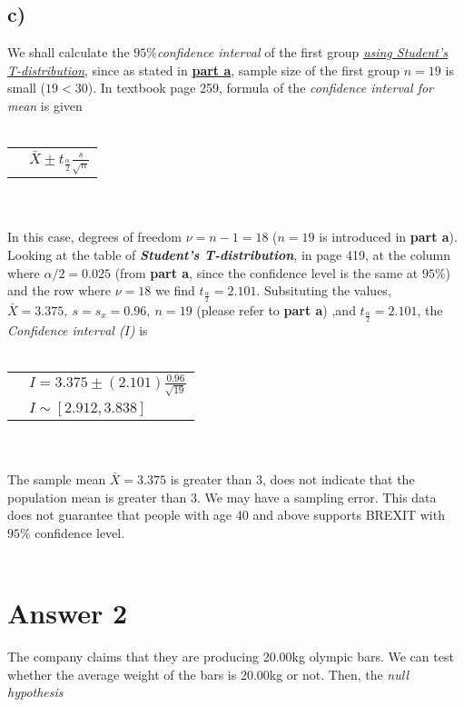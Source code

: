 \documentclass[12pt]{article}
\begin{document}
\subsection*{c)}
We shall calculate the $95\%$\textit{confidence interval} 
of the first group \underline{\textit{using Student’s T-distribution}}, 
since as stated in \hyperlink{small}{\textbf{part a}},
sample size of the first group $n=19$ is small ($19<30$).
In textbook page 259, formula of the
\textit{\hypertarget{confmean}{confidence interval} for mean} 
is given
\\ \\
\begin{tabular}{l l}
    &$\bar{X} \pm t_{\frac{\alpha}{2}}\frac{s}{\sqrt{n}}$\\
\end{tabular}
\\ \\
In this case, degrees of freedom $\nu=n-1=18$ ($n=19$ 
is introduced in \textbf{part a}). Looking at the table of
\textit{\textbf{Student’s T-distribution}}, in page 419, at the 
column where \hyperlink{partalpha}{$\alpha/2=0.025$} (from \textbf{part a},
since the confidence level is the same at $95\%$)
and the row where $\nu=18$ we find $t_{\frac{\alpha}{2}}=2.101$. 
Subsituting the values, $\bar{X}=3.375,\ s=s_x=0.96,\ n=19$ (please 
refer to \textbf{part a}) ,and $t_{\frac{\alpha}{2}}=2.101$,
the \textit{Confidence interval ($I$)} is 
\\ \\
\begin{tabular}{l l}
    &$I=3.375 \pm (2.101)\frac{0.96}{\sqrt{19}}$\\
    &$I\sim [2.912,3.838]$\\
\end{tabular}
\\ \\
The sample 
mean $\bar{X}=3.375$ is greater than $3$, does 
not indicate that the population mean is greater 
than $3$. We may have a sampling error. This data 
does not guarantee that people with age 40 and above 
supports BREXIT with $95\%$ confidence level.
\\ \\
\section*{Answer 2}
The company claims that they are producing
20.00kg olympic bars. We can test whether 
the average weight of the bars is 20.00kg or not.
Then, the \textit{null hypothesis}
\end{document}
